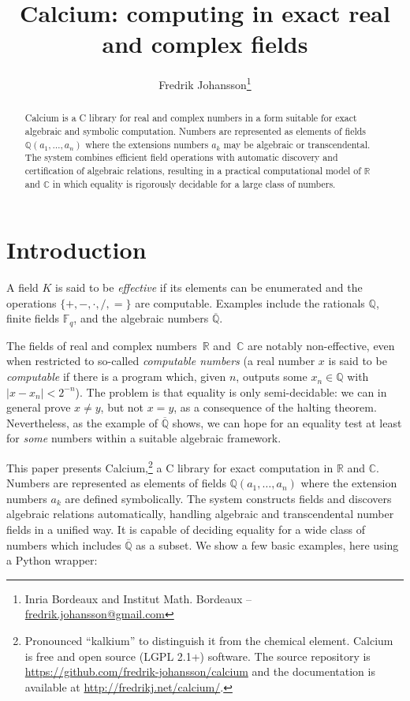 \documentclass[11pt,a4paper]{article}
\title{Calcium: computing in exact real and complex fields}
\date{}
\author{Fredrik Johansson\footnote{Inria Bordeaux and Institut Math. Bordeaux -- \url{fredrik.johansson@gmail.com}}}
\begin{document}
\maketitle

\begin{abstract}
Calcium is a C library for real and complex numbers
in a form suitable for exact algebraic and symbolic computation.
Numbers are represented as elements of
fields $\mathbb{Q}(a_1,\ldots,a_n)$ where
the extensions numbers
$a_k$ may be algebraic or transcendental.
The system combines efficient field operations
with automatic discovery and certification of algebraic relations,
resulting in a practical computational model of $\mathbb{R}$ and $\mathbb{C}$
in which equality is rigorously decidable for a large class of numbers.
\end{abstract}

\section{Introduction}

A field $K$ is said to be \emph{effective}
if its elements can be enumerated
and the operations $\{+, -, \cdot, /, =\}$
are computable.
Examples include the rationals $\mathbb{Q}$, finite fields $\mathbb{F}_q$,
and the algebraic numbers $\overline{\mathbb{Q}}$.

The fields of real and complex numbers~$\mathbb{R}$ and~$\mathbb{C}$
are notably non-effective, even 
when restricted to so-called \emph{computable numbers}
(a real number $x$ is said to be \emph{computable} if
there is a program
which, given $n$, outputs some $x_n \in \mathbb{Q}$ with $|x - x_n| < 2^{-n}$).
The problem is that equality is only semi-decidable: we can in general prove $x \ne y$,
but not $x = y$, as a consequence of the halting theorem.
Nevertheless,
as the example of $\overline{\mathbb{Q}}$ shows,
we can hope for an equality test at least for \emph{some} numbers
within a suitable algebraic framework.

This paper presents Calcium,\footnote{Pronounced ``kalkium'' to distinguish it from
the chemical element. Calcium is free and open source
(LGPL 2.1+) software. The source repository is
\url{https://github.com/fredrik-johansson/calcium} and
the documentation is available at \url{http://fredrikj.net/calcium/}.} a C library
for exact computation in $\mathbb{R}$ and $\mathbb{C}$.
Numbers are represented as elements of fields
$\mathbb{Q}(a_1,\ldots,a_n)$ where the extension numbers $a_k$
are defined symbolically.
The system constructs fields and discovers algebraic relations
automatically,
handling algebraic and transcendental number fields in a unified way.
It is capable of deciding equality
for a wide class of numbers
which includes $\overline{\mathbb{Q}}$ as a subset.
We show a few basic examples, here using a Python wrapper:
\end{document}
